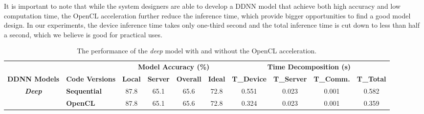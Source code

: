 \documentclass[format=acmsmall, review=false, screen=true]{acmart}
\begin{document}
It is important to note that while the system designers are able to develop a DDNN model that achieve both high accuracy and low computation time, the OpenCL acceleration further reduce the inference time, which provide bigger opportunities to find a good model design. In our experiments, the device inference time takes only one-third second and the total inference time is cut down to less than half a second, which we believe is good for practical uses.

\begin{table}[hbt!]
    \centering
    \caption{The performance of the \emph{deep} model with and without the OpenCL acceleration.}
    \label{tab:oclresults}
    \scriptsize{
    \begin{tabular}{cl|cccc|cccc}
                                      &                         & \multicolumn{4}{c|}{\textbf{Model Accuracy (\%)}}                    & \multicolumn{4}{c}{\textbf{Time Decomposition (s)}}                            \\
    \textbf{DDNN Models}              & \textbf{Code Versions} & \textbf{Local} & \textbf{Server} & \textbf{Overall} & \textbf{Ideal} & \textbf{T\_Device} & \textbf{T\_Server} & \textbf{T\_Comm.} & \textbf{T\_Total} \\ \hline\hline
    \multirow{2}{*}{\textit{\textbf{Deep}}} & \textbf{Sequential} & 87.8           & 65.1            & 65.6             & 72.8           & 0.551              & 0.023              & 0.001             & 0.582             \\ \cline{2-10}
                                      & \textbf{OpenCL}    & 87.8           & 65.1            & 65.6             & 72.8           & 0.324                & 0.023              & 0.001             & 0.359             \\ %
    \end{tabular}

    }%

    \end{table}
\end{document}
